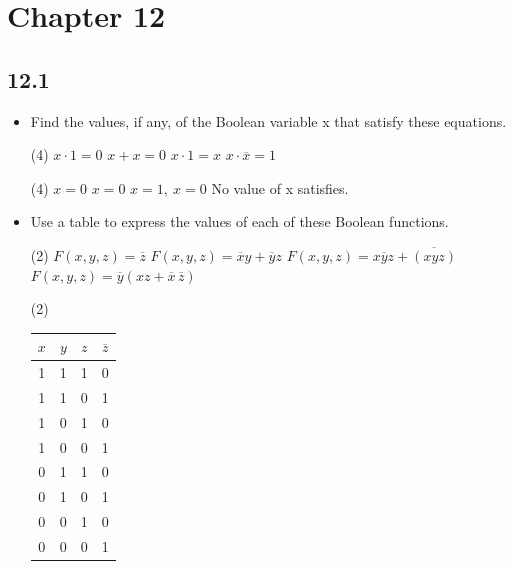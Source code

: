 \section{Chapter 12}
\subsection{12.1}
\begin{itemize}
    \item[2.] Find the values, if any, of the Boolean variable x that
          satisfy these equations.
          \begin{tasks}(4)
              \task $x \cdot 1 = 0$
              \task $x + x = 0$
              \task $x \cdot 1 = x$
              \task $x \cdot \overline{x} = 1$
          \end{tasks}
          \answer
          \begin{tasks}(4)
              \task $x = 0$
              \task $x = 0$
              \task $x = 1,\ x = 0$
              \task No value of x satisfies.
          \end{tasks}

    \item[6.]  Use a table to express the values of each of these Boolean
          functions.
          \begin{tasks}(2)
              \task $F(x, y, z) = \overline{z}$
              \task $F(x, y, z) = \overline{x}y + \overline{y}z$
              \task $F(x, y, z) = x\overline{y}z + \overline{(xyz)}$
              \task $F(x, y, z) = \overline{y}(xz + \overline{x}\, \overline{z})$
          \end{tasks}

          \answer

          \begin{tasks}(2)
              \task \text{}\\
              \begin{tabular}{*{4}{|c}|}
                  $x$ & $y$ & $z$ & $\overline{z}$ \\
                     & 1   & 1   & 0              \\
                  1   & 1   & 0   & 1              \\
                  1   & 0   & 1   & 0              \\
                  1   & 0   & 0   & 1              \\
                  0   & 1   & 1   & 0              \\
                  0   & 1   & 0   & 1              \\
                  0   & 0   & 1   & 0              \\
                  0   & 0   & 0   & 1              \\
                  \hline
              \end{tabular}


\end{tasks}
\end{itemize}
